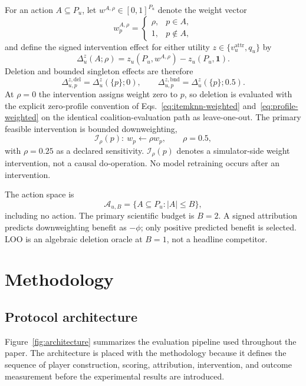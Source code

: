 \documentclass[manuscript,screen,review,anonymous]{acmart}
\begin{document}
For an action $A\subseteq P_u$, let $w^{A,\rho}\in[0,1]^{P_u}$ denote the weight vector
\begin{equation}
w_p^{A,\rho}=\begin{cases}\rho,&p\in A,\\1,&p\notin A,\end{cases}
\end{equation}
and define the signed intervention effect for either utility $z\in\{v_u^{\mathrm{attr}},q_u\}$ by
\begin{equation}
\Delta_u^z(A;\rho)=z_u(P_u,w^{A,\rho})-z_u(P_u,\mathbf{1}).
\end{equation}
Deletion and bounded singleton effects are therefore
\begin{equation}
\Delta_{u,p}^{z,\mathrm{del}}=\Delta_u^z(\{p\};0),
\qquad
\Delta_{u,p}^{z,\mathrm{bnd}}=\Delta_u^z(\{p\};0.5).
\end{equation}
At $\rho=0$ the intervention assigns weight zero to $p$, so deletion is evaluated with the explicit zero-profile convention of Eqs.~\eqref{eq:itemknn-weighted} and~\eqref{eq:profile-weighted} on the identical coalition-evaluation path as leave-one-out. The primary feasible intervention is bounded downweighting,
\begin{equation}
\mathcal{I}_\rho(p):\ w_p\leftarrow\rho w_p,\qquad \rho=0.5,
\end{equation}
with $\rho=0.25$ as a declared sensitivity. $\mathcal{I}_\rho(p)$ denotes a simulator-side weight intervention, not a causal do-operation. No model retraining occurs after an intervention.

The action space is
\begin{equation}
\mathcal A_{u,B}=\{A\subseteq P_u:|A|\le B\},
\end{equation}
including no action. The primary scientific budget is $B=2$. A signed attribution predicts downweighting benefit as $-\phi$; only positive predicted benefit is selected. LOO is an algebraic deletion oracle at $B=1$, not a headline competitor.

\section{Methodology}
\subsection{Protocol architecture}
Figure~\ref{fig:architecture} summarizes the evaluation pipeline used throughout the paper. The architecture is placed with the methodology because it defines the sequence of player construction, scoring, attribution, intervention, and outcome measurement before the experimental results are introduced.
\end{document}
